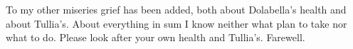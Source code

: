

 To my other miseries grief has been added, both about Dolabella's health and about Tullia's. About everything in sum I know neither what plan to take nor what to do. Please look after your own health and Tullia's. Farewell.
